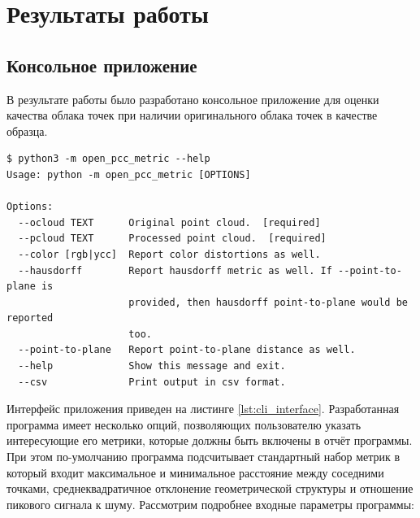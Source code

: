 

\newpage
\chapter{Результаты работы}

\section{Консольное приложение}

В результате работы было разработано консольное приложение для оценки качества
облака точек при наличии оригинального облака точек в качестве образца.

\begin{lstlisting}[caption={
    Интерфейс разработанного консольного приложения
}, basicstyle=\footnotesize\ttfamily, label={lst:cli_interface}]
$ python3 -m open_pcc_metric --help
Usage: python -m open_pcc_metric [OPTIONS]

Options:
  --ocloud TEXT      Original point cloud.  [required]
  --pcloud TEXT      Processed point cloud.  [required]
  --color [rgb|ycc]  Report color distortions as well.
  --hausdorff        Report hausdorff metric as well. If --point-to-plane is
                     provided, then hausdorff point-to-plane would be reported
                     too.
  --point-to-plane   Report point-to-plane distance as well.
  --help             Show this message and exit.
  --csv              Print output in csv format.
\end{lstlisting}

Интерфейс приложения приведен на листинге \ref{lst:cli_interface}. Разработанная
программа имеет несколько опций, позволяющих пользователю указать интересующие
его метрики, которые должны быть включены в отчёт программы. При этом
по-умолчанию программа подсчитывает стандартный набор метрик в который входит
максимальное и минимальное расстояние между соседними точками,
среднеквадратичное отклонение геометрической структуры и отношение пикового
сигнала к шуму. Рассмотрим подробнее входные параметры программы:


